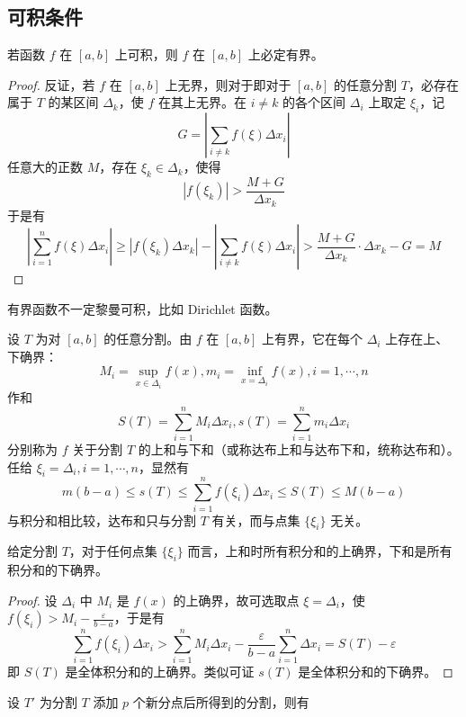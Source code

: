 \subsection{可积条件}

\begin{theorem}
    若函数 $f$ 在 $[a,b]$ 上可积，则 $f$ 在 $[a,b]$ 上必定有界。
\end{theorem}
\begin{proof}
    反证，若 $f$ 在 $[a,b]$ 上无界，则对于即对于 $[a,b]$ 的任意分割 $T$，必存在属于 $T$ 的某区间 $\Delta_k$，使 $f$ 在其上无界。在 $i\ne k$ 的各个区间 $\Delta_i$ 上取定 $\xi_i$，记
    $$G = \left| \sum_{i\ne k}f(\xi)\Delta x_i \right|$$    
    任意大的正数 $M$，存在 $\xi_k\in \Delta_k$，使得
    $$|f(\xi_k)| > \frac{M+G}{\Delta x_k}$$
    于是有
    $$\left| \sum_{i=1}^nf(\xi)\Delta x_i \right| \geqslant |f(\xi_k)\Delta x_k| - \left| \sum_{i\ne k}f(\xi)\Delta x_i \right| > \frac{M+G}{\Delta x_k}\cdot \Delta x_k - G = M$$
\end{proof}

有界函数不一定黎曼可积，比如 Dirichlet 函数。

设 $T$ 为对 $[a,b]$ 的任意分割。由 $f$ 在 $[a,b]$ 上有界，它在每个 $\Delta_i$ 上存在上、下确界：
$$M_i=\sup_{x\in\Delta_i}f(x),m_i = \inf_{x=\Delta_i}f(x),i=1,\cdots,n$$
作和
$$S(T) = \sum_{i=1}^nM_i\Delta x_i, s(T) = \sum_{i=1}^n m_i \Delta x_i$$
分别称为 $f$ 关于分割 $T$ 的上和与下和（或称达布上和与达布下和，统称达布和）。任给 $\xi_i = \Delta_i,i=1,\cdots,n$，显然有
$$m(b-a) \leqslant s(T) \leqslant \sum_{i=1}^n f(\xi_i)\Delta x_i \leqslant S(T) \leqslant M(b-a)$$
与积分和相比较，达布和只与分割 $T$ 有关，而与点集 $\{\xi_i\}$ 无关。

\begin{proposition}
    给定分割 $T$，对于任何点集 $\{\xi_i\}$ 而言，上和时所有积分和的上确界，下和是所有积分和的下确界。
\end{proposition}
\begin{proof}
    设 $\Delta_i$ 中 $M_i$ 是 $f(x)$ 的上确界，故可选取点 $\xi=\Delta_i$，使 $f(\xi_i)>M_i-\frac{\varepsilon}{b-a}$，于是有
    $$\sum_{i=1}^nf(\xi_i)\Delta x_i > \sum_{i=1}^nM_i\Delta x_i-\frac{\varepsilon}{b-a}\sum_{i=1}^n\Delta x_i = S(T)-\varepsilon$$
    即 $S(T)$ 是全体积分和的上确界。类似可证 $s(T)$ 是全体积分和的下确界。
\end{proof}


\begin{proposition}
    设 $T'$ 为分割 $T$ 添加 $p$ 个新分点后所得到的分割，则有
    
\end{proposition}

